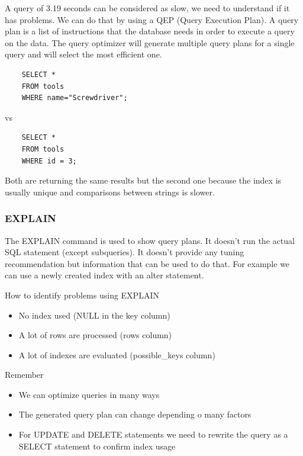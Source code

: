 A query of 3.19 seconds can be considered as slow, we need to understand if it has problems. We can do that by using a QEP (Query Execution Plan). A query plan is a list of instructions that the database needs in order to execute a query on the data. The query optimizer will generate multiple query plans for a single query and will select the most efficient one.

\begin{verbatim}
    SELECT *
    FROM tools
    WHERE name="Screwdriver";
\end{verbatim}

vs

\begin{verbatim}
    SELECT * 
    FROM tools 
    WHERE id = 3;
\end{verbatim}

Both are returning the same results but the second one because the index is usually unique and comparisons between strings is slower. 

\subsubsection{EXPLAIN}

The EXPLAIN command is used to show query plans. It doesn't run the actual SQL statement (except subqueries). It doesn't provide any tuning recommendation but information that can be used to do that. For example we can use a newly created index with an alter statement. 

How to identify problems using EXPLAIN
\begin{itemize}
    \item No index used (NULL in the key column)
    \item A lot of rows are processed (rows column)
    \item A lot of indexes are evaluated (possible\_keys column)
\end{itemize}

Remember

\begin{itemize}
    \item We can optimize queries in many ways
    \item The generated query plan can change depending o many factors
    \item For UPDATE and DELETE statements we need to rewrite the query as a SELECT statement to confirm index usage
\end{itemize}

